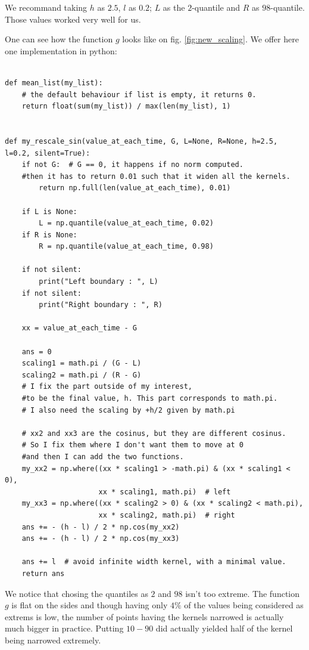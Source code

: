 \documentclass[11pt]{book}
\begin{document}
\begin{remarque}
We recommand taking $h$ as $2.5$, $l$ as $0.2$; $L$ as the $2$-quantile and $R$ as $98$-quantile. Those values worked very well for us.
\end{remarque}

One can see how the function $g$ looks like on fig. \ref{fig:new_scaling}. We offer here one implementation in python:

\begin{verbatim}

def mean_list(my_list):
    # the default behaviour if list is empty, it returns 0.
    return float(sum(my_list)) / max(len(my_list), 1)
    
    
def my_rescale_sin(value_at_each_time, G, L=None, R=None, h=2.5, l=0.2, silent=True):
    if not G:  # G == 0, it happens if no norm computed.
    #then it has to return 0.01 such that it widen all the kernels.
        return np.full(len(value_at_each_time), 0.01)

    if L is None:
        L = np.quantile(value_at_each_time, 0.02)
    if R is None:
        R = np.quantile(value_at_each_time, 0.98)

    if not silent:
        print("Left boundary : ", L)
    if not silent:
        print("Right boundary : ", R)

    xx = value_at_each_time - G

    ans = 0
    scaling1 = math.pi / (G - L)
    scaling2 = math.pi / (R - G)
    # I fix the part outside of my interest,
    #to be the final value, h. This part corresponds to math.pi.
    # I also need the scaling by +h/2 given by math.pi

    # xx2 and xx3 are the cosinus, but they are different cosinus.
    # So I fix them where I don't want them to move at 0 
    #and then I can add the two functions.
    my_xx2 = np.where((xx * scaling1 > -math.pi) & (xx * scaling1 < 0),
                      xx * scaling1, math.pi)  # left
    my_xx3 = np.where((xx * scaling2 > 0) & (xx * scaling2 < math.pi),
                      xx * scaling2, math.pi)  # right
    ans += - (h - l) / 2 * np.cos(my_xx2)
    ans += - (h - l) / 2 * np.cos(my_xx3)

    ans += l  # avoid infinite width kernel, with a minimal value.
    return ans
\end{verbatim}


\begin{remarque}
We notice that chosing the quantiles as $2$ and $98$ isn't too extreme. The function $g$ is flat on the sides and though having only $4\%$ of the values being considered as extrems is low, the number of points having the kernels narrowed is actually much bigger in practice. Putting $10-90$ did actually yielded half of the kernel being narrowed extremely.
\end{remarque}
\end{document}
